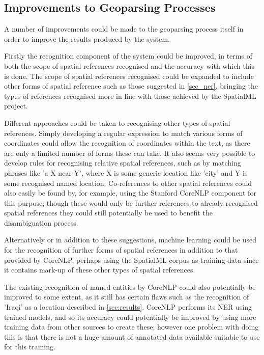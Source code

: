 \documentclass[12pt, a4paper]{report}
\begin{document}





\subsection{Improvements to Geoparsing Processes}
\label{subsec:improvements_processes}

A number of improvements could be made to the geoparsing process itself in order to improve the results produced by the system.

Firstly the recognition component of the system could be improved, in terms of both the scope of spatial references recognised and the accuracy with which this is done. The scope of spatial references recognised could be expanded to include other forms of spatial reference such as those suggested in \ref{sec_ner}, bringing the types of references recognised more in line with those achieved by the SpatialML project.

Different approaches could be taken to recognising other types of spatial references. Simply developing a regular expression to match various forms of coordinates could allow the recognition of coordinates within the text, as there are only a limited number of forms these can take. It also seems very possible to develop rules for recognising relative spatial references, such as by matching phrases like 'a X near Y', where X is some generic location like 'city' and Y is some recognised named location. Co-references to other spatial references could also easily be found by, for example, using the Stanford CoreNLP component for this purpose; though these would only be further references to already recognised spatial references they could still potentially be used to benefit the disambiguation process.

Alternatively or in addition to these suggestions, machine learning could be used for the recognition of further forms of spatial references in addition to that provided by CoreNLP, perhaps using the SpatialML corpus as training data since it contains mark-up of these other types of spatial references.

The existing recognition of named entities by CoreNLP could also potentially be improved to some extent, as it still has certain flaws such as the recognition of 'Iraqi' as a location described in \ref{sec:results}. CoreNLP performs its NER using trained models, and so its accuracy could potentially be improved by using more training data from other sources to create these; however one problem with doing this is that there is not a huge amount of annotated data available suitable to use for this training.
\end{document}

